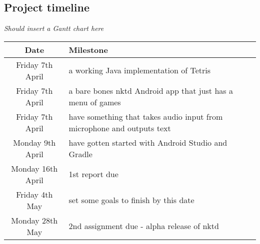 \documentclass[11pt, oneside]{article}
\begin{document}
\subsection*{Project timeline}

{\em Should insert a Gantt chart here}


\begin{table}[h!]
  \centering
  \begin{tabular}{|c|l|}
    \hline
    Date & Milestone\\
    \hline
    Friday 7th April & a working Java implementation of Tetris \\

    Friday 7th April & a bare bones nktd Android app that just has a
    menu of games \\

    Friday 7th April & have something that takes audio input from
    microphone and outputs text \\

    Monday 9th April & have gotten started with Android Studio and Gradle \\

    Monday 16th April & 1st report due \\

    Friday 4th May & set some goals to finish by this date \\

    Monday 28th May & 2nd assignment due - alpha release of nktd \\
    \hline
  \end{tabular}
\end{table}


\end{document}
